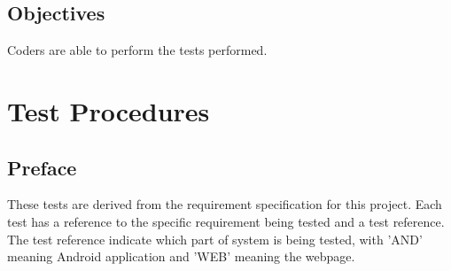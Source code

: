 \documentclass[10pt,a4paper]{article}
\begin{document}
\subsection{Objectives}
Coders are able to perform the tests performed.

\section{Test Procedures}
\subsection{Preface}
These tests are derived from the requirement specification \cite{reqspec} for this project. Each test has a reference to the specific requirement being tested and a test reference. The test reference indicate which part of system is being tested, with 'AND' meaning Android application and 'WEB' meaning the webpage.

\newpage
\end{document}
